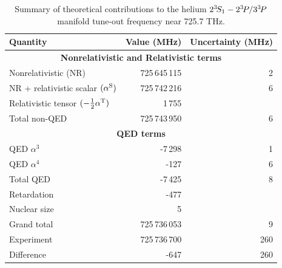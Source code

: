 	\begin{table}[t]
	\centering
	\begin{tabular}{l r r}
	\hline\hline
	Quantity    &Value (MHz) & Uncertainty (MHz) \\
	\hline
	\multicolumn{3}{c}{\textbf{Nonrelativistic and Relativistic terms}} \\
	Nonrelativistic (NR) & 725\,645\,115& 2       \\
	NR + relativistic scalar $(\alpha^{\rm S})$    & 725\,742\,216&6   \\
	Relativistic tensor $(-\frac12\alpha^{\rm T})$ &   1\,755& \\
	\hline
	Total non-QED        & 725\,743\,950&6     \\
	\hline
	\multicolumn{3}{c}{\textbf{QED terms}} \\
	QED $\alpha^3$       &       -7\,298& 1       \\
	QED $\alpha^4$       &          -127& 6       \\
	\hline
	Total QED            &         -7\,425& 8     \\
	\hline
	Retardation          &          -477 &        \\
	Nuclear size         &             5&          \\
	\hline
	Grand total          & 725\,736\,053& 9       \\
	Experiment           & 725\,736\,700& 260 \\
	\hline
	Difference           &          -647& 260\\
	\hline\hline
	\end{tabular}\\
	\caption{\label{tab:theory}Summary of theoretical contributions to the helium $2^{3\!}S_1- 2^{3\!}P / 3^{3\!}P$ manifold tune-out frequency near 725.7 THz.}
	\label{tab:theory}
	\end{table}

